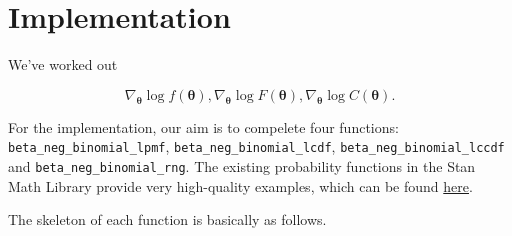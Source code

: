 \documentclass[11pt]{article}
\begin{document}
\section{Implementation}
\begin{comment}
Here are all source code 
https://github.com/stan-dev/math/tree/develop/stan/math/prim/prob
\end{comment}

We've worked out

\begin{equation}
\nabla _{\boldsymbol {\theta}}\log f(\boldsymbol\theta), \nabla _{\boldsymbol {\theta}}\log F(\boldsymbol\theta), \nabla _{\boldsymbol {\theta}}\log C(\boldsymbol\theta).
\end{equation}


For the implementation, our aim is to compelete four functions: \verb|beta_neg_binomial_lpmf|, \verb|beta_neg_binomial_lcdf|, \verb|beta_neg_binomial_lccdf| and \verb|beta_neg_binomial_rng|. The existing probability functions in the Stan Math Library provide very high-quality examples, which can be found \href{https://github.com/stan-dev/math/tree/develop/stan/math/prim/prob}{here}.




The skeleton of each function is basically as follows.
\end{document}
